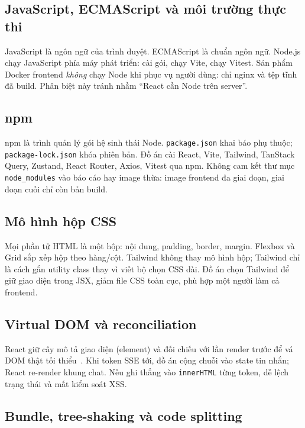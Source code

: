 \subsection{JavaScript, ECMAScript và môi trường thực thi}

JavaScript là ngôn ngữ của trình duyệt. ECMAScript là chuẩn ngôn ngữ. Node.js
chạy JavaScript phía máy phát triển: cài gói, chạy Vite, chạy Vitest. Sản phẩm
Docker frontend \emph{không} chạy Node khi phục vụ người dùng: chỉ nginx và tệp
tĩnh đã build. Phân biệt này tránh nhầm ``React cần Node trên server''.

\subsection{npm}

npm là trình quản lý gói hệ sinh thái Node. \texttt{package.json} khai báo phụ
thuộc; \texttt{package-lock.json} khóa phiên bản. Đồ án cài React, Vite, Tailwind,
TanStack Query, Zustand, React Router, Axios, Vitest qua npm. Không cam kết thư
mục \texttt{node\_modules} vào báo cáo hay image thừa: image frontend đa giai
đoạn, giai đoạn cuối chỉ còn bản build.

\subsection{Mô hình hộp CSS}

Mọi phần tử HTML là một hộp: nội dung, padding, border, margin. Flexbox và Grid
sắp xếp hộp theo hàng/cột. Tailwind không thay mô hình hộp; Tailwind chỉ là cách
gắn utility class thay vì viết bộ chọn CSS dài. Đồ án chọn Tailwind để giữ giao
diện trong JSX, giảm file CSS toàn cục, phù hợp một người làm cả frontend.

\subsection{Virtual DOM và reconciliation}

React giữ cây mô tả giao diện (element) và đối chiếu với lần render trước để
vá DOM thật tối thiểu~\cite{react}. Khi token SSE tới, đồ án cộng chuỗi vào
state tin nhắn; React re-render khung chat. Nếu ghi thẳng vào
\texttt{innerHTML} từng token, dễ lệch trạng thái và mất kiểm soát XSS.

\subsection{Bundle, tree-shaking và code splitting}

